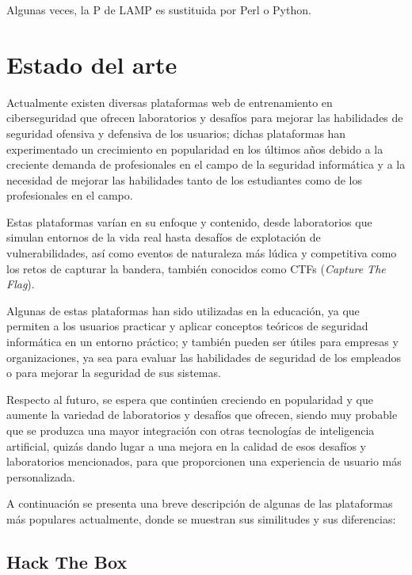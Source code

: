             Algunas veces, la P de LAMP es sustituida por Perl o Python.                  

            \cleardoublepage

    
     
\chapter{Estado del arte}
    \label{cap:estado-arte}

    Actualmente existen diversas plataformas web de entrenamiento en ciberseguridad que ofrecen laboratorios y desafíos para mejorar las habilidades de seguridad ofensiva y defensiva de los usuarios; dichas plataformas han experimentado un crecimiento en popularidad en los últimos años debido a la creciente demanda de profesionales en el campo de la seguridad informática y a la necesidad de mejorar las habilidades tanto de los estudiantes como de los profesionales en el campo.
    
    Estas plataformas varían en su enfoque y contenido, desde laboratorios que simulan entornos de la vida real hasta desafíos de explotación de vulnerabilidades, así como eventos de naturaleza más lúdica y competitiva como los retos de capturar la bandera, también conocidos como CTFs (\textit{Capture The Flag}).
    
    Algunas de estas plataformas han sido utilizadas en la educación, ya que permiten a los usuarios practicar y aplicar conceptos teóricos de seguridad informática en un entorno práctico; y también pueden ser útiles para empresas y organizaciones, ya sea para evaluar las habilidades de seguridad de los empleados o para mejorar la seguridad de sus sistemas.
    
    Respecto al futuro, se espera que continúen creciendo en popularidad y que aumente la variedad de laboratorios y desafíos que ofrecen, siendo muy probable que se produzca una mayor integración con otras tecnologías de inteligencia artificial, quizás dando lugar a una mejora en la calidad de esos desafíos y laboratorios mencionados, para que proporcionen una experiencia de usuario más personalizada.
    
    A continuación se presenta una breve descripción de algunas de las plataformas más populares actualmente, donde se muestran sus similitudes y sus diferencias:
    
    \newpage
    
    
    \section{Hack The Box}
    
